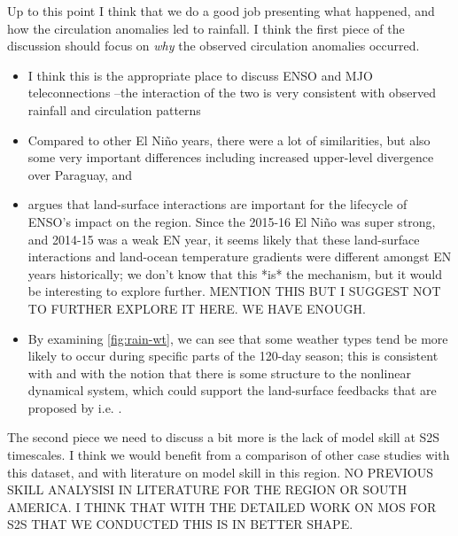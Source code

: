 \documentclass[twocol]{ametsoc}
\begin{document}
Up to this point I think that we do a good job presenting what happened, and how the circulation anomalies led to rainfall.
I think the first piece of the discussion should focus on \emph{why} the observed circulation anomalies occurred.
\begin{itemize}
	\item I think this is the appropriate place to discuss ENSO and MJO teleconnections --the interaction of the two is very consistent with observed rainfall and circulation patterns
	\item Compared to other El Ni\~{n}o years, there were a lot of similarities, but also some very important differences including increased upper-level divergence over Paraguay, and
	\item \citet{Grimm2009} argues that land-surface interactions are important for the lifecycle of ENSO's impact on the region.
	Since the 2015-16 El Ni\~no was super strong, and 2014-15 was a weak EN year, it seems likely that these land-surface interactions and land-ocean temperature gradients were different amongst EN years historically; we don't know that this *is* the mechanism, but it would be interesting to explore further. MENTION THIS BUT I SUGGEST NOT TO FURTHER EXPLORE IT HERE. WE HAVE ENOUGH.
	\item By examining \cref{fig:rain-wt}, we can see that some weather types tend be more likely to occur during specific parts of the 120-day season; this is consistent with \citet{Munoz2016} and with the notion that there is some structure to the nonlinear dynamical system, which could support the land-surface feedbacks that are proposed by i.e. \citep{Grimm:2009bq}.
\end{itemize}

The second piece we need to discuss a bit more is the lack of model skill at S2S timescales.
I think we would benefit from a comparison of other case studies with this dataset, and with literature on model skill in this region.
NO PREVIOUS SKILL ANALYSISI IN LITERATURE FOR THE REGION OR SOUTH AMERICA. I THINK THAT WITH THE DETAILED WORK ON MOS FOR S2S THAT WE CONDUCTED THIS IS IN BETTER SHAPE.
\end{document}
